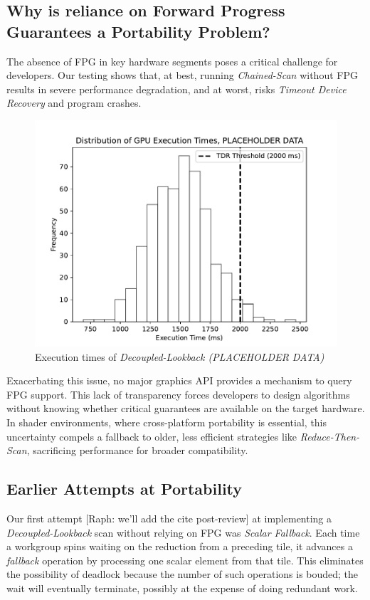 \documentclass[sigconf]{acmart}
\newcommand{\raph}[1]{{\footnotesize\color{magenta}[Raph: #1]}}
\begin{document}
\subsection{Why is reliance on Forward Progress Guarantees a Portability Problem?}
The absence of FPG in key hardware segments poses a critical challenge for developers. Our testing shows that, at best, running \emph{Chained-Scan} without FPG results in severe performance degradation, and at worst, risks \emph{Timeout Device Recovery} and program crashes.
\begin{figure}
  \centering
  \includegraphics[width=\linewidth]{graphics/Figure_1.pdf}
  \caption{Execution times of \emph{Decoupled-Lookback (PLACEHOLDER DATA)}}
\end{figure}
Exacerbating this issue, no major graphics API provides a mechanism to query FPG support. This lack of transparency forces developers to design algorithms without knowing whether critical guarantees are available on the target hardware. In shader environments, where cross-platform portability is essential, this uncertainty compels a fallback to older, less efficient strategies like \emph{Reduce-Then-Scan}, sacrificing performance for broader compatibility.

\subsection{Earlier Attempts at Portability}
Our first attempt \raph{we'll add the cite post-review} at implementing a \emph{Decoupled-Lookback} scan without relying on FPG was \emph{Scalar Fallback}. Each time a workgroup spins waiting on the reduction from a preceding tile, it advances a \emph{fallback} operation by processing one scalar element from that tile. This eliminates the possibility of deadlock because the number of such operations is bouded; the wait will eventually terminate, possibly at the expense of doing redundant work.
\end{document}
